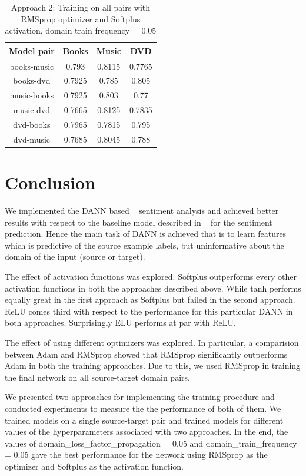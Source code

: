 \documentclass[11pt,a4paper]{article}
\begin{document}
\begin{table}[h]
\begin{center}
\begin{tabular}{|c|c|c|c|}
\hline
Model pair & Books & Music & DVD \\
\hline
books-music & 0.793 & 0.8115 & 0.7765 \\
\hline
books-dvd & 0.7925 & 0.785 & 0.805 \\
\hline
music-books & 0.7925 & 0.803 & 0.77 \\
\hline
music-dvd & 0.7665 & 0.8125 & 0.7835 \\
\hline
dvd-books & 0.7965 & 0.7815 & 0.795 \\
\hline
dvd-music & 0.7685 & 0.8045 & 0.788 \\
\hline
\end{tabular}
\end{center}
\caption{ Approach 2: Training on all pairs with RMSprop optimizer and Softplus activation, domain train frequency = 0.05}
\label{final-results-1d-table}
\end{table}


\section{Conclusion}
We implemented the DANN based ~\cite{Ganin:2016} sentiment analysis and achieved better results with respect to the baseline model described in ~\cite{Britz} for the sentiment prediction. Hence the main task of DANN is achieved that is to learn features which is predictive of the source example labels, but uninformative about the domain of the input (source or target).


The effect of activation functions was explored. Softplus outperforms every other activation functions in both the approaches described above. While tanh performs equally great in the first approach as Softplus but failed in the second approach. ReLU comes third with respect to the performance for this particular DANN in both approaches. Surprisingly ELU performs at par with ReLU.

The effect of using different optimizers was explored. In particular, a comparision between Adam and RMSprop showed that RMSprop significantly outperforms Adam in both the training approaches. Due to this, we used RMSprop in training the final network on all source-target domain pairs.

We presented two approaches for implementing the training procedure and conducted experiments to measure the the performance of both of them. We trained models on a single source-target pair and trained models for different values of the hyperparameters associated with two approaches. In the end, the values of domain\_loss\_factor\_propagation = 0.05 and domain\_train\_frequency = 0.05 gave the best performance for the network using RMSprop as the optimizer and Softplus as the activation function.
\end{document}
